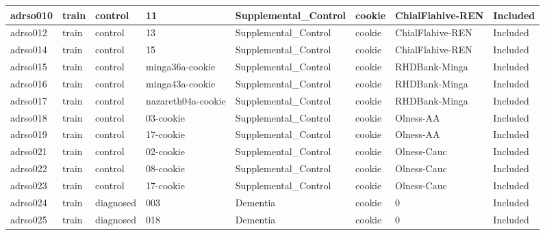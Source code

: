 \begin{center}
\begin{longtable}{|l|l|l|l|l|l|l|l|}
adrso010       & train                 & control           & 11                 & Supplemental\_Control & cookie          & ChialFlahive-REN & Included      \\ \hline
adrso012       & train                 & control           & 13                 & Supplemental\_Control & cookie          & ChialFlahive-REN & Included      \\ \hline
adrso014       & train                 & control           & 15                 & Supplemental\_Control & cookie          & ChialFlahive-REN & Included      \\ \hline
adrso015       & train                 & control           & minga36a-cookie    & Supplemental\_Control & cookie          & RHDBank-Minga    & Included      \\ \hline
adrso016       & train                 & control           & minga43a-cookie    & Supplemental\_Control & cookie          & RHDBank-Minga    & Included      \\ \hline
adrso017       & train                 & control           & nazareth04a-cookie & Supplemental\_Control & cookie          & RHDBank-Minga    & Included      \\ \hline
adrso018       & train                 & control           & 03-cookie          & Supplemental\_Control & cookie          & Olness-AA        & Included      \\ \hline
adrso019       & train                 & control           & 17-cookie          & Supplemental\_Control & cookie          & Olness-AA        & Included      \\ \hline
adrso021       & train                 & control           & 02-cookie          & Supplemental\_Control & cookie          & Olness-Cauc      & Included      \\ \hline
adrso022       & train                 & control           & 08-cookie          & Supplemental\_Control & cookie          & Olness-Cauc      & Included      \\ \hline
adrso023       & train                 & control           & 17-cookie          & Supplemental\_Control & cookie          & Olness-Cauc      & Included      \\ \hline
adrso024       & train                 & diagnosed         & 003                & Dementia             & cookie          & 0                & Included      \\ \hline
adrso025       & train                 & diagnosed         & 018                & Dementia             & cookie          & 0                & Included      \\ \hline

\end{longtable}
\end{center}
